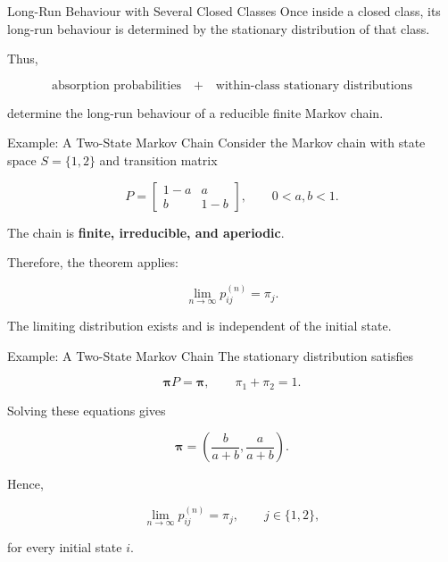 \documentclass[
  ignorenonframetext,
  aspectratio=169,
]{beamer}
\begin{document}
\begin{frame}{Long-Run Behaviour with Several Closed Classes}
\protect{}\label{long-run-behaviour-with-several-closed-classes-1}
Once inside a closed class, its long-run behaviour is determined by the
stationary distribution of that class.

Thus,

\[
\boxed{
\text{absorption probabilities}
\quad+\quad
\text{within-class stationary distributions}
}
\]

determine the long-run behaviour of a reducible finite Markov chain.
\end{frame}

\begin{frame}{Example: A Two-State Markov Chain}
\protect{}\label{example-a-two-state-markov-chain}
Consider the Markov chain with state space \(S=\{1,2\}\) and transition
matrix

\[
P=
\begin{bmatrix}
1-a&a\\
b&1-b
\end{bmatrix},
\qquad 0<a,b<1.
\]

The chain is \textbf{finite, irreducible, and aperiodic}.

Therefore, the theorem applies:

\[
\lim_{n\to\infty}p_{ij}^{(n)}=\pi_j.
\]

The limiting distribution exists and is independent of the initial
state.
\end{frame}

\begin{frame}{Example: A Two-State Markov Chain}
\protect{}\label{example-a-two-state-markov-chain-1}
The stationary distribution satisfies

\[
\boldsymbol{\pi}P=\boldsymbol{\pi},
\qquad
\pi_1+\pi_2=1.
\]

Solving these equations gives

\[
\boxed{
\boldsymbol{\pi}
=
\left(
\frac{b}{a+b},
\frac{a}{a+b}
\right)
}.
\]

Hence,

\[
\lim_{n\to\infty}p_{ij}^{(n)}
=
\pi_j,
\qquad j\in\{1,2\},
\]

for every initial state \(i\).
\end{frame}
\end{document}
